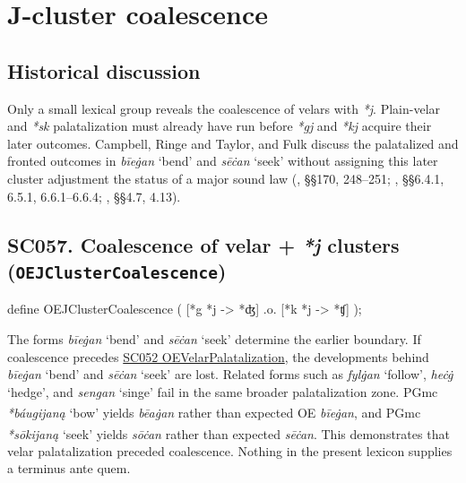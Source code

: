 \documentclass[
  british,
  a4paper,
  openany]{book}
\providecommand{\Pred}[1]{\textsuperscript{\dag}\emph{#1}}
\providecommand{\Recon}[1]{\emph{*#1}}
{\catcode`→=\active \global\def→{\ensuremath{\rightarrow}}}
\providecommand{\texorpdfstring}[2]{#1}
\providecommand{\Pred}[1]{\textsuperscript{\dag}\emph{#1}}
\providecommand{\Recon}[1]{\emph{*#1}}
{\catcode`→=\active \global\def→{\ensuremath{\rightarrow}}}
\begin{document}
\newpage

\section{J-cluster coalescence}\label{j-cluster-coalescence}

\subsection{Historical discussion}\label{historical-discussion-29}

Only a small lexical group reveals the coalescence of velars with
\emph{*j}. Plain-velar and \emph{*sk} palatalization must already have
run before \emph{*gj} and \emph{*kj} acquire their later outcomes.
Campbell, Ringe and Taylor, and Fulk discuss the palatalized and fronted
outcomes in \emph{bīeġan} `bend' and \emph{sēċan} `seek' without
assigning this later cluster adjustment the status of a major sound law
(, §§170,
248--251; , §§6.4.1, 6.5.1, 6.6.1--6.6.4; , §§4.7, 4.13).

\subsection{\texorpdfstring{SC057. Coalescence of velar + \emph{*j}
clusters
(\texttt{OEJClusterCoalescence})}{SC057. Coalescence of velar +  clusters (OEJClusterCoalescence)}}\label{rule-OEJClusterCoalescence}

\begin{ReaderFacingFoma}
define OEJClusterCoalescence (
    [{*g} {*j} -> {*ʤ}]
    .o. [{*k} {*j} -> {*ʧ}]
);
\end{ReaderFacingFoma}

The forms \emph{bīeġan} `bend' and \emph{sēċan} `seek' determine the
earlier boundary. If coalescence precedes
\hyperref[rule-OEVelarPalatalization]{SC052 OEVelarPalatalization}, the
developments behind \emph{bīeġan} `bend' and \emph{sēċan} `seek' are
lost. Related forms such as \emph{fylġan} `follow', \emph{heċġ} `hedge',
and \emph{sengan} `singe' fail in the same broader palatalization zone.
PGmc \Recon{báugijaną} `bow' yields \Pred{bēaġan} rather than expected
OE \emph{bīeġan}, and PGmc \Recon{sōkijaną} `seek' yields \Pred{sōċan}
rather than expected \emph{sēċan}. This demonstrates that velar
palatalization preceded coalescence. Nothing in the present lexicon
supplies a terminus ante quem.
\end{document}
